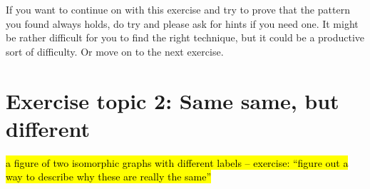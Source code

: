 \documentclass[nobib]{tufte-handout}
\begin{document}
If you want to continue on with this exercise and try to prove that the pattern you found always holds, do try and please ask for hints if you need one. It might be rather difficult for you to find the right technique, but it could be a productive sort of difficulty. Or move on to the next exercise.

\section{Exercise topic 2: Same same, but different}

\begin{xca}
    \hl{a figure of two isomorphic graphs with different labels -- exercise: ``figure out a way to describe why these are really the same''}
\end{xca}

%
%
\end{document}
